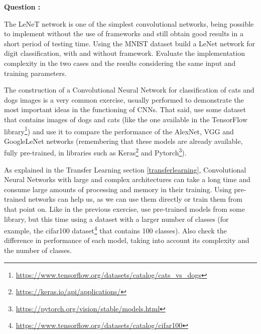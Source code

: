 \begin{list}{
\textbf{Question :}~}{}
\item \noindent The LeNeT network is one of the simplest convolutional networks, being possible to implement without the use of frameworks and still obtain good results in a short period of testing time. Using the MNIST dataset build a LeNet network for digit classification, with and without framework. Evaluate the implementation complexity in the two cases and the results considering the same input and training parameters.


\item The construction of a Convolutional Neural Network for classification of cats and dogs images is a very common exercise, usually performed to demonstrate the most important ideas in the functioning of CNNs. That said, use some dataset that contains images of dogs and cats (like the one available in the TensorFlow library\footnote{\url{https://www.tensorflow.org/datasets/catalog/cats_vs_dogs}}) and use it to compare the performance of the AlexNet, VGG and GoogleLeNet networks (remembering that these models are already available, fully pre-trained, in libraries such as Keras\footnote{\url{https://keras.io/api/applications/}} and Pytorch\footnote{\url{https://pytorch.org/vision/stable/models.html}}).


\item As explained in the Transfer Learning section \ref{transferlearning}, Convolutional Neural Networks with large and complex architectures can take a long time and consume large amounts of processing and memory in their training. Using pre-trained networks can help us, as we can use them directly or train them from that point on. Like in the previous exercise, use pre-trained models from some library, but this time using a dataset with a larger number of classes (for example, the cifar100 dataset\footnote{\url{https://www.tensorflow.org/datasets/catalog/cifar100}} that contains 100 classes). Also check the difference in performance of each model, taking into account its complexity and the number of classes.
\end{list}